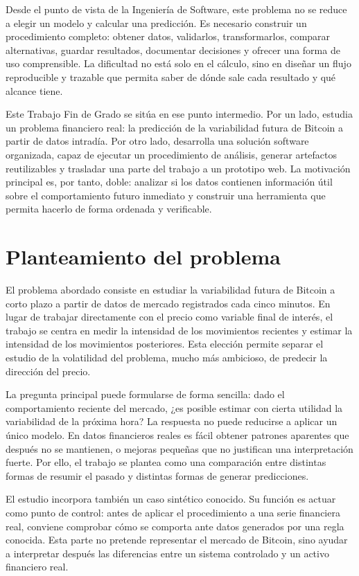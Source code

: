 Desde el punto de vista de la Ingeniería de Software, este problema no se reduce a elegir un modelo y calcular una predicción. Es necesario construir un procedimiento completo: obtener datos, validarlos, transformarlos, comparar alternativas, guardar resultados, documentar decisiones y ofrecer una forma de uso comprensible. La dificultad no está solo en el cálculo, sino en diseñar un flujo reproducible y trazable que permita saber de dónde sale cada resultado y qué alcance tiene.

Este Trabajo Fin de Grado se sitúa en ese punto intermedio. Por un lado, estudia un problema financiero real: la predicción de la variabilidad futura de Bitcoin a partir de datos intradía. Por otro lado, desarrolla una solución software organizada, capaz de ejecutar un procedimiento de análisis, generar artefactos reutilizables y trasladar una parte del trabajo a un prototipo web. La motivación principal es, por tanto, doble: analizar si los datos contienen información útil sobre el comportamiento futuro inmediato y construir una herramienta que permita hacerlo de forma ordenada y verificable.

\section{Planteamiento del problema}\label{sec:planteamiento-problema}

El problema abordado consiste en estudiar la variabilidad futura de Bitcoin a corto plazo a partir de datos de mercado registrados cada cinco minutos. En lugar de trabajar directamente con el precio como variable final de interés, el trabajo se centra en medir la intensidad de los movimientos recientes y estimar la intensidad de los movimientos posteriores. Esta elección permite separar el estudio de la volatilidad del problema, mucho más ambicioso, de predecir la dirección del precio.

La pregunta principal puede formularse de forma sencilla: dado el comportamiento reciente del mercado, ¿es posible estimar con cierta utilidad la variabilidad de la próxima hora? La respuesta no puede reducirse a aplicar un único modelo. En datos financieros reales es fácil obtener patrones aparentes que después no se mantienen, o mejoras pequeñas que no justifican una interpretación fuerte. Por ello, el trabajo se plantea como una comparación entre distintas formas de resumir el pasado y distintas formas de generar predicciones.

El estudio incorpora también un caso sintético conocido. Su función es actuar como punto de control: antes de aplicar el procedimiento a una serie financiera real, conviene comprobar cómo se comporta ante datos generados por una regla conocida. Esta parte no pretende representar el mercado de Bitcoin, sino ayudar a interpretar después las diferencias entre un sistema controlado y un activo financiero real.

